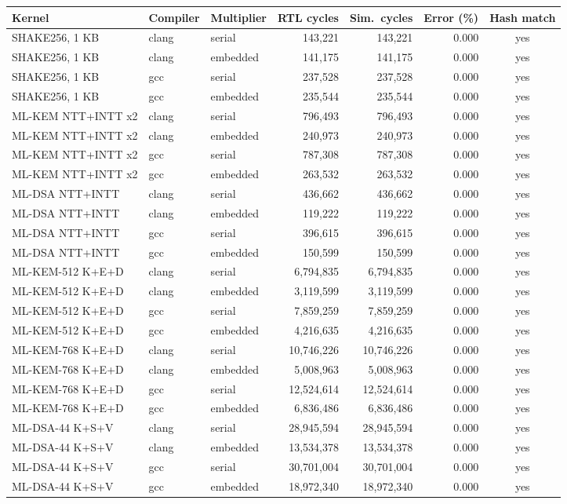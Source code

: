 \begin{tabular}{lllrrrc}\toprule
Kernel & Compiler & Multiplier & RTL cycles & Sim.\ cycles & Error (\%) & Hash match \\\midrule
SHAKE256, 1 KB & clang & serial & 143,221 & 143,221 & 0.000 & yes \\
SHAKE256, 1 KB & clang & embedded & 141,175 & 141,175 & 0.000 & yes \\
SHAKE256, 1 KB & gcc & serial & 237,528 & 237,528 & 0.000 & yes \\
SHAKE256, 1 KB & gcc & embedded & 235,544 & 235,544 & 0.000 & yes \\
ML-KEM NTT+INTT x2 & clang & serial & 796,493 & 796,493 & 0.000 & yes \\
ML-KEM NTT+INTT x2 & clang & embedded & 240,973 & 240,973 & 0.000 & yes \\
ML-KEM NTT+INTT x2 & gcc & serial & 787,308 & 787,308 & 0.000 & yes \\
ML-KEM NTT+INTT x2 & gcc & embedded & 263,532 & 263,532 & 0.000 & yes \\
ML-DSA NTT+INTT & clang & serial & 436,662 & 436,662 & 0.000 & yes \\
ML-DSA NTT+INTT & clang & embedded & 119,222 & 119,222 & 0.000 & yes \\
ML-DSA NTT+INTT & gcc & serial & 396,615 & 396,615 & 0.000 & yes \\
ML-DSA NTT+INTT & gcc & embedded & 150,599 & 150,599 & 0.000 & yes \\
ML-KEM-512 K+E+D & clang & serial & 6,794,835 & 6,794,835 & 0.000 & yes \\
ML-KEM-512 K+E+D & clang & embedded & 3,119,599 & 3,119,599 & 0.000 & yes \\
ML-KEM-512 K+E+D & gcc & serial & 7,859,259 & 7,859,259 & 0.000 & yes \\
ML-KEM-512 K+E+D & gcc & embedded & 4,216,635 & 4,216,635 & 0.000 & yes \\
ML-KEM-768 K+E+D & clang & serial & 10,746,226 & 10,746,226 & 0.000 & yes \\
ML-KEM-768 K+E+D & clang & embedded & 5,008,963 & 5,008,963 & 0.000 & yes \\
ML-KEM-768 K+E+D & gcc & serial & 12,524,614 & 12,524,614 & 0.000 & yes \\
ML-KEM-768 K+E+D & gcc & embedded & 6,836,486 & 6,836,486 & 0.000 & yes \\
ML-DSA-44 K+S+V & clang & serial & 28,945,594 & 28,945,594 & 0.000 & yes \\
ML-DSA-44 K+S+V & clang & embedded & 13,534,378 & 13,534,378 & 0.000 & yes \\
ML-DSA-44 K+S+V & gcc & serial & 30,701,004 & 30,701,004 & 0.000 & yes \\
ML-DSA-44 K+S+V & gcc & embedded & 18,972,340 & 18,972,340 & 0.000 & yes \\
\bottomrule
\end{tabular}
